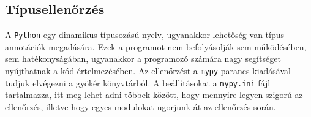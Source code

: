 \subsection{Típusellenőrzés}
A \texttt{Python} egy dinamikus típusozású nyelv, ugyanakkor lehetőség van típus annotációk megadására.
Ezek a programot nem befolyásolják sem működésében, sem hatékonyságában, ugyanakkor a programozó számára
nagy segítséget nyújthatnak a kód értelmezésében. Az ellenőrzést a \texttt{mypy} parancs kiadásával
tudjuk elvégezni a gyökér könyvtárból. A beállításokat a \texttt{mypy.ini} fájl tartalmazza, itt meg lehet
adni többek között, hogy mennyire legyen szigorú az ellenőrzés, illetve hogy egyes modulokat ugorjunk át az ellenőrzés során.
